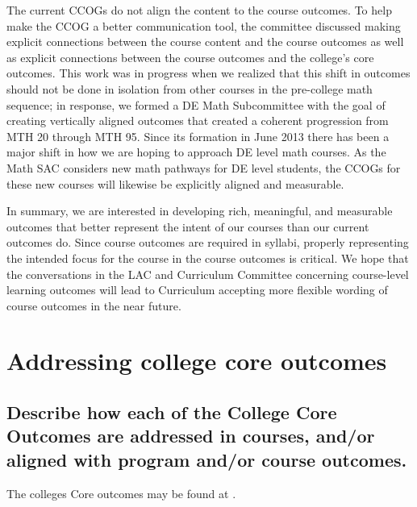 The current CCOGs do not align the content to the course outcomes. To help
make the CCOG a better communication tool, the committee discussed making
explicit connections between the course content and the course outcomes as well
as explicit connections between the course outcomes and the college's core
outcomes.  This work was in progress when we realized that this shift in
outcomes should not be done in isolation from other courses in the pre-college
math sequence; in response, we formed a DE Math Subcommittee with the goal of
creating vertically aligned outcomes that created a coherent progression from
MTH 20 through MTH 95.  Since its formation in June 2013 there has been a major
shift in how we are hoping to approach DE level math courses.  As the Math SAC
considers new math pathways for DE level students, the CCOGs for these new
courses will likewise be explicitly aligned and measurable.

In summary, we are interested in developing rich, meaningful, and measurable
outcomes that better represent the intent of our courses than our current
outcomes do. Since course outcomes are required in syllabi, properly
representing the intended focus for the course in the course outcomes is
critical. We hope that the conversations in the LAC and Curriculum Committee
concerning course-level learning outcomes will lead to Curriculum accepting more
flexible wording of course outcomes in the near future.


\section{Addressing college core outcomes}

\subsection[Outcomes in courses and the math program]{Describe how each of the
	College Core Outcomes are addressed in courses, and/or aligned with program
and/or course outcomes.}

The colleges Core outcomes may be found at \cite{coreoutcomes}.


